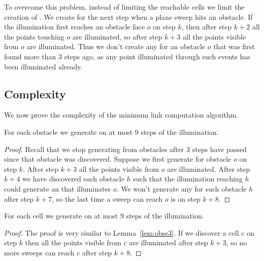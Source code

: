\documentclass[english,gradu]{tktltiki2018}
\begin{document}
To overcome this problem, instead of limiting the reachable cells we limit the creation of \addEs.
We create \addEs for the next step when a plane sweep hits an obstacle.
If the illumination first reaches an obstacle face $o$ on step $k$, then after step $k+2$ all the points touching $o$ are illuminated, so after step $k+3$ all the points visible from $o$ are illuminated.
Thus we don't create any \addEs for an obstacle $o$ that was first found more than 3 steps ago, as any point illuminated through such events has been illuminated already.

\subsection{Complexity}

We now prove the complexity of the minimum link computation algorithm.

\begin{lem}\label{lem:obse3}For each obstacle we generate \obsE on at most 9 steps of the illumination.\end{lem}
\begin{proof}
Recall that we stop generating \addEs from obstacles after 3 steps have passed since that obstacle was discovered.
Suppose we first generate \obsE for obstacle $o$ on step $k$.
After step $k+3$ all the points visible from $o$ are illuminated.
After step $k+4$ we have discovered each obstacle $h$ such that the illumination reaching $h$ could generate an \addE that illuminates $o$.
We won't generate any \addEs for such obstacle $h$ after step $k+7$, so the last time a sweep can reach $o$ is on step $k+8$.
\end{proof}

\begin{lem}\label{lem:celle3}For each cell we generate \cellE on at most 9 steps of the illumination.\end{lem}
\begin{proof}
The proof is very similar to Lemma~\ref{lem:obse3}.
If we discover a cell $c$ on step $k$ then all the points visible from $c$ are illuminated after step $k+3$, so no more sweeps can reach $c$ after step $k+8$.
\end{proof}
\end{document}
